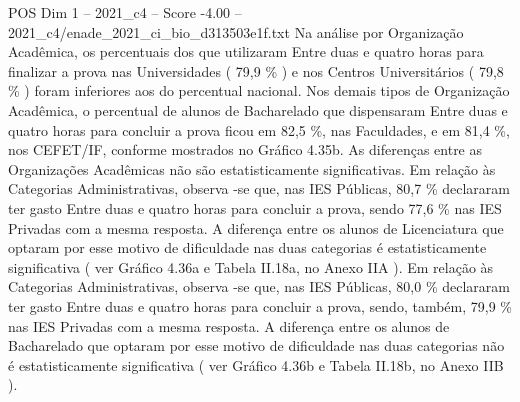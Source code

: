 \begin{textsample}{POS Dim 1 – 2021\_c4 – Score -4.00 – 2021\_c4/enade\_2021\_ci\_bio\_d313503e1f.txt}
Na análise por Organização Acadêmica, os percentuais dos que utilizaram Entre duas e quatro horas para finalizar a prova nas Universidades ( 79,9 \% ) e nos Centros Universitários ( 79,8 \% ) foram inferiores aos do percentual nacional.
Nos demais tipos de Organização Acadêmica, o percentual de alunos de Bacharelado que dispensaram Entre duas e quatro horas para concluir a prova ficou em 82,5 \%, nas Faculdades, e em 81,4 \%, nos CEFET/IF, conforme mostrados no Gráfico 4.35b.
As diferenças entre as Organizações Acadêmicas não são estatisticamente significativas.
Em relação às Categorias Administrativas, observa -se que, nas IES Públicas, 80,7 \% declararam ter gasto Entre duas e quatro horas para concluir a prova, sendo 77,6 \% nas IES Privadas com a mesma resposta.
A diferença entre os alunos de Licenciatura que optaram por esse motivo de dificuldade nas duas categorias é estatisticamente significativa ( ver Gráfico 4.36a e Tabela II.18a, no Anexo IIA ).
Em relação às Categorias Administrativas, observa -se que, nas IES Públicas, 80,0 \% declararam ter gasto Entre duas e quatro horas para concluir a prova, sendo, também, 79,9 \% nas IES Privadas com a mesma resposta.
A diferença entre os alunos de Bacharelado que optaram por esse motivo de dificuldade nas duas categorias não é estatisticamente significativa ( ver Gráfico 4.36b e Tabela II.18b, no Anexo IIB ).

\end{textsample}
